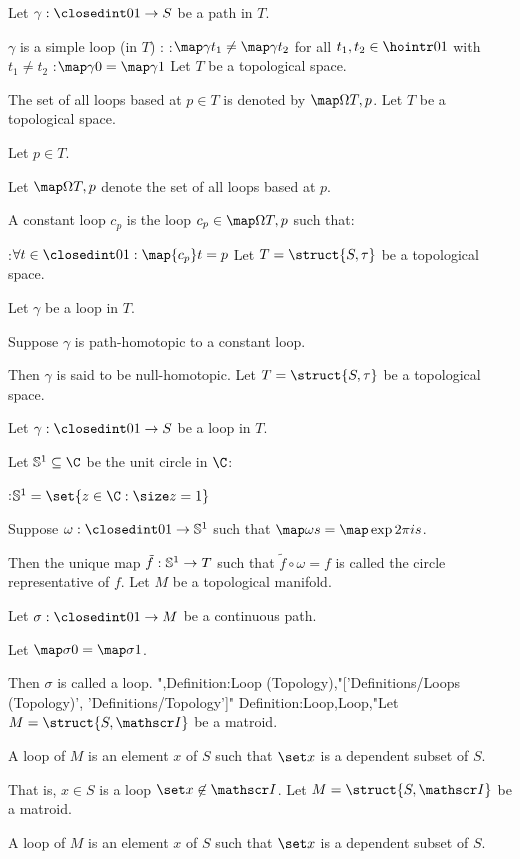 Let $\gamma: \closedint 0 1 \to S$ be a path in $T$.


$\gamma$ is a simple loop (in $T$) :
:$\map \gamma {t_1} \ne \map \gamma {t_2}$ for all $t_1 ,t_2 \in \hointr 0 1$ with $t_1 \ne t_2$
:$\map \gamma 0 = \map \gamma 1$
Let $T$ be a topological space.


The set of all loops based at $p \in T$ is denoted by $\map \Omega {T, p}$.
Let $T$ be a topological space.

Let $p \in T$.

Let $\map \Omega {T, p}$ denote the set of all loops based at $p$.


A constant loop $c_p$ is the loop $c_p \in \map \Omega {T, p}$ such that:

:$\forall t \in \closedint 0 1 : \map {c_p} t = p$
Let $T = \struct {S, \tau}$ be a topological space.

Let $\gamma$ be a loop in $T$.

Suppose $\gamma$ is path-homotopic to a constant loop.


Then $\gamma$ is said to be null-homotopic.
Let $T = \struct {S, \tau}$ be a topological space.

Let $\gamma: \closedint 0 1 \to S$ be a loop in $T$.

Let $\Bbb S^1 \subseteq \C$ be the unit circle in $\C$:

:$\Bbb S^1 = \set {z \in \C : \size z = 1}$

Suppose $\omega : \closedint 0 1 \to \Bbb S^1$ such that $\map \omega s = \map \exp {2 \pi i s}$.


Then the unique map $\tilde f : \Bbb S^1 \to T$ such that $\tilde f \circ \omega = f$ is called the circle representative of $f$.
Let $M$ be a topological manifold.

Let $\sigma : \closedint 0 1 \to M$ be a continuous path.

Let $\map \sigma 0 = \map \sigma 1$.


Then $\sigma$ is called a loop.
",Definition:Loop (Topology),"['Definitions/Loops (Topology)', 'Definitions/Topology']"
Definition:Loop,Loop,"Let $M = \struct {S, \mathscr I}$ be a matroid.


A loop of $M$ is an element $x$ of $S$ such that $\set x$ is a dependent subset of $S$.

That is, $x \in S$ is a loop  $\set x \not \in \mathscr I$.
Let $M = \struct {S, \mathscr I}$ be a matroid.


A loop of $M$ is an element $x$ of $S$ such that $\set x$ is a dependent subset of $S$.

